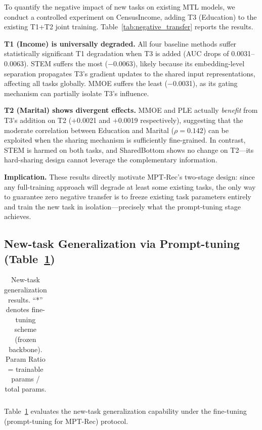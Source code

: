 \documentclass[review,anonymous]{acmart}
\begin{document}
To quantify the negative impact of new tasks on existing MTL models, we conduct a
controlled experiment on CensusIncome, adding T3 (Education) to the existing T1+T2
joint training. Table~\ref{tab:negative_transfer} reports the results.

\textbf{T1 (Income) is universally degraded.} All four baseline methods suffer
statistically significant T1 degradation when T3 is added (AUC drops of
0.0031--0.0063). STEM suffers the most ($-$0.0063), likely because its
embedding-level separation propagates T3's gradient updates to the shared input
representations, affecting all tasks globally. MMOE suffers the least
($-$0.0031), as its gating mechanism can partially isolate T3's influence.

\textbf{T2 (Marital) shows divergent effects.} MMOE and PLE actually
\emph{benefit} from T3's addition on T2 ($+$0.0021 and $+$0.0019 respectively),
suggesting that the moderate correlation between Education and Marital
($\rho = 0.142$) can be exploited when the sharing mechanism is sufficiently
fine-grained. In contrast, STEM is harmed on both tasks, and SharedBottom shows
no change on T2---its hard-sharing design cannot leverage the complementary
information.

\textbf{Implication.} These results directly motivate MPT-Rec's two-stage design:
since any full-training approach will degrade at least some existing tasks,
the only way to guarantee zero negative transfer is to freeze existing task
parameters entirely and train the new task in isolation---precisely what the
prompt-tuning stage achieves.

\subsection{New-task Generalization via Prompt-tuning (Table~\ref{tab:new_task_generalization})}

\begin{table}[t]
  \centering
  \caption{New-task generalization results. ``*'' denotes fine-tuning scheme
           (frozen backbone). Param Ratio = trainable params / total params.}
  \label{tab:new_task_generalization}
  \begin{tabular}{lccc} \\
    \bottomrule
  \end{tabular}
\end{table}

Table~\ref{tab:new_task_generalization} evaluates the new-task generalization
capability under the fine-tuning (prompt-tuning for MPT-Rec) protocol.
\end{document}
